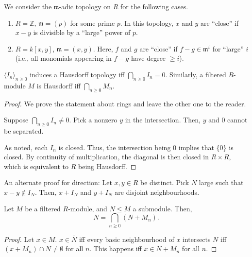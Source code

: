 \documentclass[12pt]{article}
\begin{document}
\begin{ex}
	We consider the $\mathfrak{m}$-adic topology on $R$ for the following cases.
	\begin{enumerate}
		\item $R = \mathbb{Z}$, $\mathfrak{m} = (p)$ for some prime $p$. \newline
		In this topology, $x$ and $y$ are ``close'' if $x - y$ is divisible by a ``large'' power of $p$.
		\item $R = k[x, y]$, $\mathfrak{m} = (x, y)$. \newline
		Here, $f$ and $g$ are ``close'' if $f - g \in \mathfrak{m}^{i}$ for ``large'' $i$ (i.e., all monomials appearing in $f - g$ have degree $\ge i$).
	\end{enumerate}
\end{ex}

\begin{prop} \label{prop:hausdorff-iff-trivial-intersection}
	$\langle I_{n} \rangle_{n \ge 0}$ induces a Hausdorff topology iff $\bigcap_{n \ge 0} I_{n} = 0$. \newline
	Similarly, a filtered $R$-module $M$ is Hausdorff iff $\bigcap_{n \ge 0} M_{n}$.
\end{prop}
\begin{proof} 
	We prove the statement about rings and leave the other one to the reader.

	\forward Suppose $\bigcap_{n \ge 0} I_{n} \neq 0$. Pick a nonzero $y$ in the intersection. Then, $y$ and $0$ cannot be separated.

	\backward As noted, each $I_{n}$ is closed. Thus, the intersection being $0$ implies that $\{0\}$ is closed. By continuity of multiplication, the diagonal is then closed in $R \times R$, which is equivalent to $R$ being Hausdorff.
\end{proof}

An alternate proof for \backward direction: Let $x, y \in R$ be distinct. Pick $N$ large such that $x - y \notin I_{N}$. Then, $x + I_{N}$ and $y + I_{N}$ are disjoint neighbourhoods.

\begin{prop}
	Let $M$ be a filtered $R$-module, and $N \le M$ a submodule. Then,
	\begin{equation*} 
		\overline{N} = \bigcap_{n \ge 0} (N + M_{n}).
	\end{equation*}
\end{prop}
\begin{proof} 
	Let $x \in M$. $x \in \overline{N}$ iff every basic neighbourhood of $x$ intersects $N$ iff $(x + M_{n}) \cap N \neq \emptyset$ for all $n$. This happens iff $x \in N + M_{n}$ for all $n$.
\end{proof}
\end{document}
